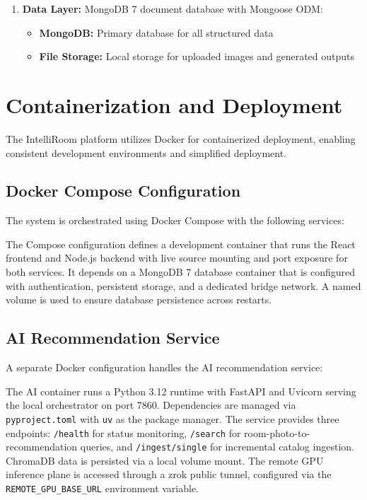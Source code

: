 \begin{enumerate}
    \item \textbf{Data Layer:} MongoDB 7 document database with Mongoose ODM:
    \begin{itemize}
        \item \textbf{MongoDB:} Primary database for all structured data
        \item \textbf{File Storage:} Local storage for uploaded images and generated outputs
    \end{itemize}
\end{enumerate}

\section{Containerization and Deployment}
\label{sec:containerization}

The IntelliRoom platform utilizes Docker for containerized deployment, enabling consistent development environments and simplified deployment.

\subsection{Docker Compose Configuration}

The system is orchestrated using Docker Compose with the following services:

The Compose configuration defines a development container that runs the React frontend and Node.js backend with live source mounting and port exposure for both services. It depends on a MongoDB 7 database container that is configured with authentication, persistent storage, and a dedicated bridge network. A named volume is used to ensure database persistence across restarts.

\subsection{AI Recommendation Service}

A separate Docker configuration handles the AI recommendation service:

The AI container runs a Python 3.12 runtime with FastAPI and Uvicorn serving the local orchestrator on port 7860. Dependencies are managed via \texttt{pyproject.toml} with \texttt{uv} as the package manager. The service provides three endpoints: \texttt{/health} for status monitoring, \texttt{/search} for room-photo-to-recommendation queries, and \texttt{/ingest/single} for incremental catalog ingestion. ChromaDB data is persisted via a local volume mount. The remote GPU inference plane is accessed through a zrok public tunnel, configured via the \texttt{REMOTE\_GPU\_BASE\_URL} environment variable.

